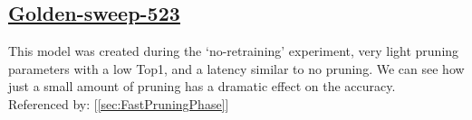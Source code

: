 \documentclass[11pt]{report}
\begin{document}
\subsection*{\protect\href{https://wandb.ai/samfh/Resnet56-Filters-Test/runs/eje5tk6m/overview?workspace=}{\underline{\color{blue}Golden-sweep-523}}}\label{sec:golden-sweep-523}
This model was created during the `no-retraining' experiment, very light pruning parameters with a low Top1, and a latency similar to no pruning. We can see how just a small amount of pruning has a dramatic effect on the accuracy.\\
Referenced by: [\ref{sec:FastPruningPhase}]
\begin{figure}[H]
    \begin{table}[H]
        \centering
        \hspace{2em}
        \quad
    \end{table}    
\end{figure}
\end{document}

